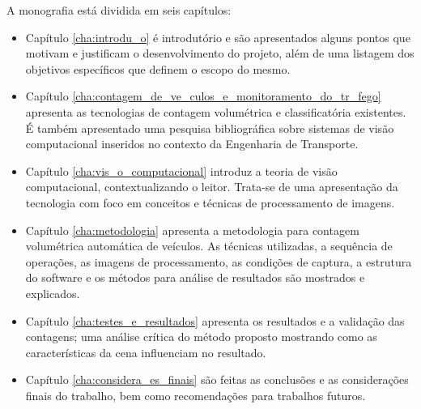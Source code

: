 A monografia está dividida em seis capítulos:

\begin{itemize}
  \item Capítulo \ref{cha:introdu_o} é introdutório e são apresentados alguns pontos que motivam e justificam o desenvolvimento do projeto, além de uma listagem dos objetivos específicos que definem o escopo do mesmo.
  \item Capítulo \ref{cha:contagem_de_ve_culos_e_monitoramento_do_tr_fego} apresenta as tecnologias de contagem volumétrica e classificatória existentes. É também apresentado uma pesquisa bibliográfica sobre sistemas de visão computacional inseridos no contexto da Engenharia de Transporte.
  \item Capítulo \ref{cha:vis_o_computacional} introduz a teoria de visão computacional, contextualizando o leitor. Trata-se de uma apresentação da tecnologia com foco em conceitos e técnicas de processamento de imagens.
  \item Capítulo \ref{cha:metodologia} apresenta a metodologia para contagem volumétrica automática de veículos. As técnicas utilizadas, a sequência de operações, as imagens de processamento, as condições de captura, a estrutura do software e os métodos para análise de resultados são mostrados e explicados. 
  \item Capítulo \ref{cha:testes_e_resultados} apresenta os resultados e a validação das contagens; uma análise crítica do método proposto mostrando como as características da cena influenciam no resultado. 
  \item Capítulo \ref{cha:considera_es_finais} são feitas as conclusões e as considerações finais do trabalho, bem como recomendações para trabalhos futuros.
\end{itemize}


